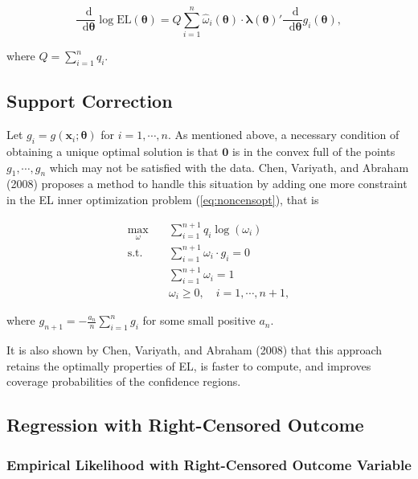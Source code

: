 \documentclass[article]{jss}
\renewcommand{\|}{\,|\,}
\begin{document}
\begin{equation}
\frac{\mathop{}\!\mathrm{d}}{\mathop{}\!\mathrm{d}\bm \theta}\log \textrm{EL}(\bm \theta) = Q \sum_{i=1}^n \hat \omega_i(\bm \theta) \cdot \bm \lambda(\bm \theta)' \frac{\mathop{}\!\mathrm{d}}{\mathop{}\!\mathrm{d}\bm \theta}g_i(\bm \theta),
\end{equation}

where \(Q = \sum_{i=1}^n q_i\).

\hypertarget{support-correction}{%
\subsection{Support Correction}\label{support-correction}}

Let \(g_i = g(\bm x_i;\bm \theta)\) for \(i = 1,\cdots, n\). As mentioned above, a necessary condition of obtaining a unique optimal solution is that \(\bm 0\) is in the convex full of the points \(g_1,\cdots,g_n\) which may not be satisfied with the data. Chen, Variyath, and Abraham (2008) proposes a method to handle this situation by adding one more constraint in the EL inner optimization problem (\ref{eq:noncensopt}), that is

\begin{equation} \label{eq:noncensoptadj}
\begin{split}
  \max_{\omega}\quad & \sum_{i=1}^{n+1} q_i \log(\omega_i) \\
  \text{s.t.}\quad & \sum_{i=1}^{n+1} \omega_i\cdot g_i = 0 \\
  & \sum_{i=1}^{n+1} \omega_i = 1 \\
  & \omega_i \geq 0, \quad i=1,\cdots,{n+1},
\end{split}
\end{equation}

where \(g_{n+1} = -\frac{a_n}{n} \sum_{i=1}^n g_i\) for some small positive \(a_n\).

It is also shown by Chen, Variyath, and Abraham (2008) that this approach retains the optimally properties of EL, is faster to compute, and improves coverage probabilities of the confidence regions.

\hypertarget{regression-with-right-censored-outcome}{%
\subsection{Regression with Right-Censored Outcome}\label{regression-with-right-censored-outcome}}

\hypertarget{empirical-likelihood-with-right-censored-outcome-variable}{%
\subsubsection{Empirical Likelihood with Right-Censored Outcome Variable}\label{empirical-likelihood-with-right-censored-outcome-variable}}
\end{document}
